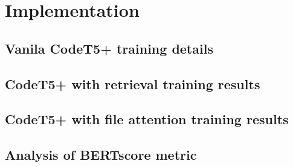 \chapter{Implementation}\label{chap:impl}

\section{Vanila CodeT5+ training details}

\section{CodeT5+ with retrieval training results}

\section{CodeT5+ with file attention training results}

\section{Analysis of BERTscore metric}
